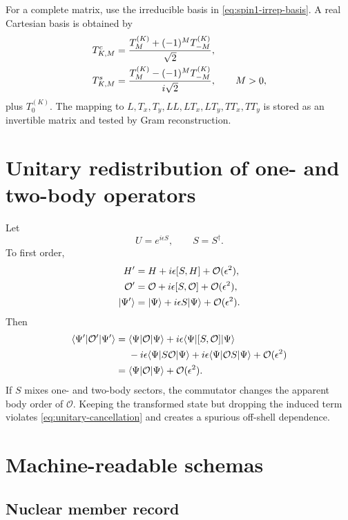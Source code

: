 \documentclass[11pt]{article}
\newcommand{\cO}{\mathcal O}
\begin{document}
For a complete matrix, use the irreducible basis in
\cref{eq:spin1-irrep-basis}.  A real Cartesian basis is obtained by
\begin{align}
 T_{K,M}^{c}&=\frac{T_M^{(K)}+(-1)^M T_{-M}^{(K)}}{\sqrt2},
\notag\\
 T_{K,M}^{s}&=\frac{T_M^{(K)}-(-1)^M T_{-M}^{(K)}}{i\sqrt2},
 \qquad M>0,
\label{eq:real-spherical-adapter}
\end{align}
plus \(T_0^{(K)}\).  The mapping to \(L,T_x,T_y,LL,LT_x,LT_y,TT_x,TT_y\)
is stored as an invertible matrix and tested by Gram reconstruction.

\section{Unitary redistribution of one- and two-body operators}
\label{app:unitary-redistribution}

Let
\begin{equation}
 U=e^{i\epsilon S},
 \qquad S=S^\dagger.
\label{eq:unitary-small-transform}
\end{equation}
To first order,
\begin{align}
 H'&=H+i\epsilon[S,H]+\cO(\epsilon^2),
\notag\\
 \cO'&=\cO+i\epsilon[S,\cO]+\cO(\epsilon^2),
\notag\\
 |\Psi'\rangle&=|\Psi\rangle+i\epsilon S|\Psi\rangle+\cO(\epsilon^2).
\label{eq:unitary-first-order}
\end{align}
Then
\begin{align}
 \langle\Psi'|\cO'|\Psi'\rangle
 ={}&\langle\Psi|\cO|\Psi\rangle
 +i\epsilon\langle\Psi|[S,\cO]|\Psi\rangle
 \notag\\
 &-i\epsilon\langle\Psi|S\cO|\Psi\rangle
 +i\epsilon\langle\Psi|\cO S|\Psi\rangle
 +\cO(\epsilon^2)
\notag\\
 ={}&\langle\Psi|\cO|\Psi\rangle+\cO(\epsilon^2).
\label{eq:unitary-cancellation}
\end{align}
If \(S\) mixes one- and two-body sectors, the commutator changes the apparent
body order of \(\cO\).  Keeping the transformed state but dropping the
induced term violates \cref{eq:unitary-cancellation} and creates a spurious
off-shell dependence.

\section{Machine-readable schemas}
\label{app:schemas}

\subsection{Nuclear member record}
\end{document}
